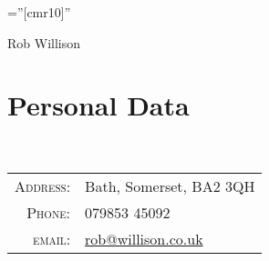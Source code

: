\documentclass[a4paper,12pt]{article}
\begin{document}

\pagestyle{empty} %

\font\fb=''[cmr10]'' %


\par{\centering
		{\LARGE Rob Willison
	}\bigskip\par}

\section{Personal Data}
\
\begin{tabular}{rl}
    \textsc{Address:}   & Bath, Somerset, BA2 3QH\\
    \textsc{Phone:}     & 079853 45092\\
    \textsc{email:}     & \href{mailto:rob@willison.co.uk}{rob@willison.co.uk}
\end{tabular}

\end{document}
